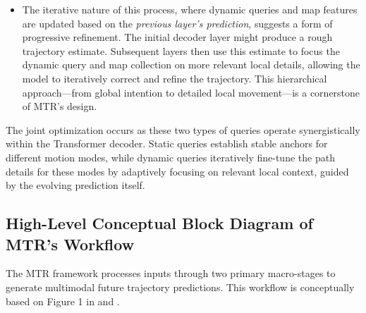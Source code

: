 \begin{enumerate}
\begin{itemize}
        \item The iterative nature of this process, where dynamic queries and map features are updated based on the \textit{previous layer's prediction}, suggests a form of progressive refinement. The initial decoder layer might produce a rough trajectory estimate. Subsequent layers then use this estimate to focus the dynamic query and map collection on more relevant local details, allowing the model to iteratively correct and refine the trajectory. This hierarchical approach—from global intention to detailed local movement—is a cornerstone of MTR's design.
    \end{itemize}
\end{enumerate}

The joint optimization occurs as these two types of queries operate synergistically within the Transformer decoder. Static queries establish stable anchors for different motion modes, while dynamic queries iteratively fine-tune the path details for these modes by adaptively focusing on relevant local context, guided by the evolving prediction itself.

\subsection{High-Level Conceptual Block Diagram of MTR's Workflow}
\label{subsec:high_level_workflow}

The MTR framework processes inputs through two primary macro-stages to generate multimodal future trajectory predictions. This workflow is conceptually based on Figure 1 in \cite{Shi2022MTR} and \cite{Shi2022MTR_A}.

